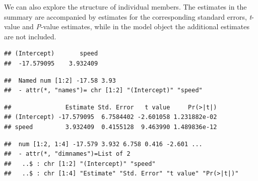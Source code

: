 \documentclass[krantz2]{krantz}\usepackage{knitr}
\begin{document}
\begin{explainbox}
We can also explore the structure of individual members. The  estimates in the summary are accompanied by estimates for the corresponding standard errors, \emph{t}-value and \emph{P}-value estimates, while in the model object  the additional estimates are not included.

\begin{knitrout}\footnotesize
{}\color{fgcolor}\begin{kframe}
\begin{alltt}
\end{alltt}
\begin{verbatim}
## (Intercept)       speed 
##  -17.579095    3.932409
\end{verbatim}
\begin{alltt}
\hlopt{$}
\end{alltt}
\begin{verbatim}
##  Named num [1:2] -17.58 3.93
##  - attr(*, "names")= chr [1:2] "(Intercept)" "speed"
\end{verbatim}
\begin{alltt}
\hlstd{(}\hlopt{$}
\end{alltt}
\begin{verbatim}
##               Estimate Std. Error   t value     Pr(>|t|)
## (Intercept) -17.579095  6.7584402 -2.601058 1.231882e-02
## speed         3.932409  0.4155128  9.463990 1.489836e-12
\end{verbatim}
\begin{alltt}
\hlstd{(}\hlopt{$}
\end{alltt}
\begin{verbatim}
##  num [1:2, 1:4] -17.579 3.932 6.758 0.416 -2.601 ...
##  - attr(*, "dimnames")=List of 2
##   ..$ : chr [1:2] "(Intercept)" "speed"
##   ..$ : chr [1:4] "Estimate" "Std. Error" "t value" "Pr(>|t|)"
\end{verbatim}
\end{kframe}
\end{knitrout}

\end{explainbox}
\end{document}
